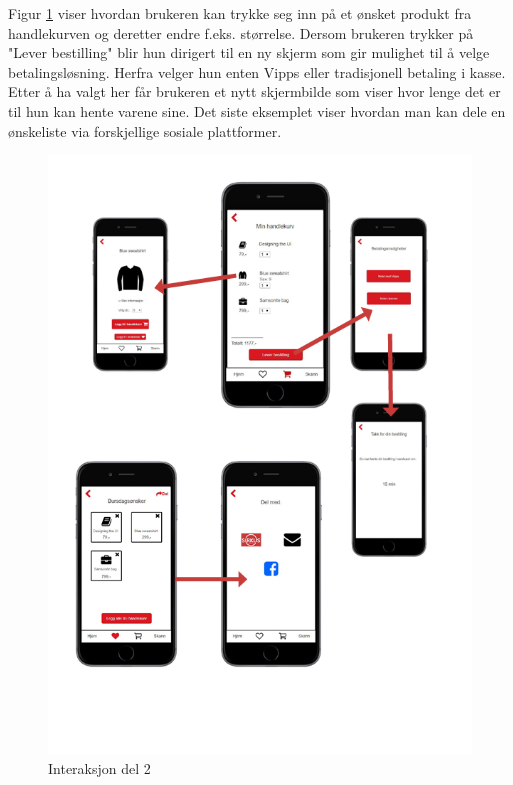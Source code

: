 \noindent Figur \ref{fig:interaksjon2} viser hvordan brukeren kan trykke seg inn på et ønsket produkt fra handlekurven og deretter endre f.eks. størrelse. Dersom brukeren trykker på "Lever bestilling" blir hun dirigert til en ny skjerm som gir mulighet til å velge betalingsløsning. Herfra velger hun enten Vipps eller tradisjonell betaling i kasse. Etter å ha valgt her får brukeren et nytt skjermbilde som viser hvor lenge det er til hun kan hente varene sine. Det siste eksemplet viser hvordan man kan dele en ønskeliste via forskjellige sosiale plattformer.

\begin{figure}[H]
\includegraphics[scale=0.75]{images/axurebilder/interaksjon2}
\centering %
\caption{Interaksjon del 2}
\label{fig:interaksjon2}
\end{figure}


